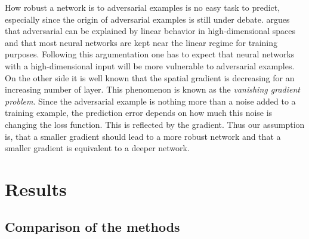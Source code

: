\documentclass[%
 reprint,
 amsmath,amssymb,
 aps,
]{revtex4-1}
\begin{document}
How robust a network is to adversarial examples is no easy task to predict, especially since the origin of adversarial examples is still under debate. \citet{paperGrad} argues that adversarial can be explained by linear behavior in high-dimensional spaces and that most neural networks are kept near the linear regime for training purposes. Following this argumentation one has to expect that neural networks with a high-dimensional input will be more vulnerable to adversarial examples.
On the other side it is well known that the spatial gradient is decreasing for an increasing number of layer. This phenomenon is known as the \emph{vanishing gradient problem}. Since the adversarial example is nothing more than a noise added to a training example, the prediction error depends on how much this noise is changing the loss function. This is reflected by the gradient. Thus our assumption is, that a smaller gradient should lead to a more robust network and that a smaller gradient is equivalent to a deeper network.



\section{Results}

\subsection{Comparison of the methods}
\end{document}
